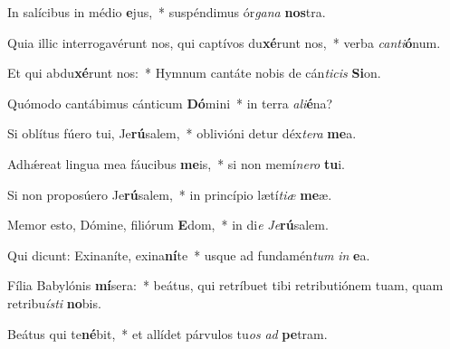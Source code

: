\item In salícibus in médio \textbf{e}jus,~* suspéndimus ór\textit{ga}\textit{na} \textbf{nos}tra.
\item Quia illic interrogavérunt nos, qui captívos du\textbf{xé}runt nos,~* verba \textit{can}\textit{ti}\textbf{ó}num.
\item Et qui abdu\textbf{xé}runt nos:~* Hymnum cantáte nobis de cán\textit{ti}\textit{cis} \textbf{Si}on.
\item Quómodo cantábimus cánticum \textbf{Dó}mini~* in terra \textit{a}\textit{li}\textbf{é}na?
\item Si oblítus fúero tui, Je\textbf{rú}salem,~* oblivióni detur déx\textit{te}\textit{ra} \textbf{me}a.
\item Adhǽreat lingua mea fáucibus \textbf{me}is,~* si non memí\textit{ne}\textit{ro} \textbf{tu}i.
\item Si non proposúero Je\textbf{rú}salem,~* in princípio lætí\textit{ti}\textit{æ} \textbf{me}æ.
\item Memor esto, Dómine, filiórum \textbf{E}dom,~* in di\textit{e} \textit{Je}\textbf{rú}salem.
\item Qui dicunt: Exinaníte, exina\textbf{ní}te~* usque ad fundamén\textit{tum} \textit{in} \textbf{e}a.
\item Fília Babylónis \textbf{mí}sera:~* beátus, qui retríbuet tibi retributiónem tuam, quam retribu\textit{ís}\textit{ti} \textbf{no}bis.
\item Beátus qui te\textbf{né}bit,~* et allídet párvulos tu\textit{os} \textit{ad} \textbf{pe}tram.
